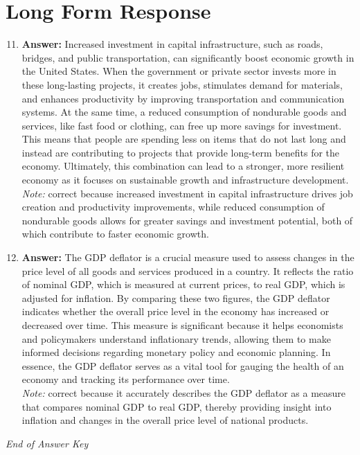 \documentclass[12pt]{article}
\begin{document}
\section*{Long Form Response}
\begin{enumerate}[label=\arabic*.]
\setcounter{enumi}{10}
\item \textbf{Answer:} Increased investment in capital infrastructure, such as roads, bridges, and public transportation, can significantly boost economic growth in the United States. When the government or private sector invests more in these long-lasting projects, it creates jobs, stimulates demand for materials, and enhances productivity by improving transportation and communication systems. At the same time, a reduced consumption of nondurable goods and services, like fast food or clothing, can free up more savings for investment. This means that people are spending less on items that do not last long and instead are contributing to projects that provide long-term benefits for the economy. Ultimately, this combination can lead to a stronger, more resilient economy as it focuses on sustainable growth and infrastructure development.
\\ \textit{Note:} correct because increased investment in capital infrastructure drives job creation and productivity improvements, while reduced consumption of nondurable goods allows for greater savings and investment potential, both of which contribute to faster economic growth.
\item \textbf{Answer:} The GDP deflator is a crucial measure used to assess changes in the price level of all goods and services produced in a country. It reflects the ratio of nominal GDP, which is measured at current prices, to real GDP, which is adjusted for inflation. By comparing these two figures, the GDP deflator indicates whether the overall price level in the economy has increased or decreased over time. This measure is significant because it helps economists and policymakers understand inflationary trends, allowing them to make informed decisions regarding monetary policy and economic planning. In essence, the GDP deflator serves as a vital tool for gauging the health of an economy and tracking its performance over time.
\\ \textit{Note:} correct because it accurately describes the GDP deflator as a measure that compares nominal GDP to real GDP, thereby providing insight into inflation and changes in the overall price level of national products.
\end{enumerate}

\vfill
\noindent\textit{End of Answer Key}
\end{document}
